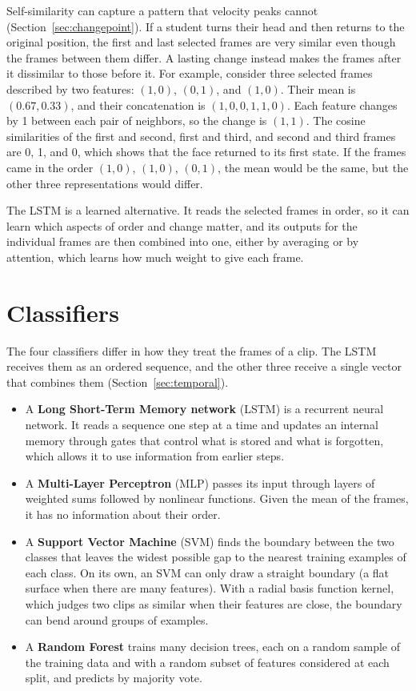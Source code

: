 Self-similarity can capture a pattern that velocity peaks cannot (Section~\ref{sec:changepoint}). If a student turns their head and then returns to the original position, the first and last selected frames are very similar even though the frames between them differ. A lasting change instead makes the frames after it dissimilar to those before it. For example, consider three selected frames described by two features: $(1, 0)$, $(0, 1)$, and $(1, 0)$. Their mean is $(0.67, 0.33)$, and their concatenation is $(1, 0, 0, 1, 1, 0)$. Each feature changes by 1 between each pair of neighbors, so the change is $(1, 1)$. The cosine similarities of the first and second, first and third, and second and third frames are 0, 1, and 0, which shows that the face returned to its first state. If the frames came in the order $(1, 0)$, $(1, 0)$, $(0, 1)$, the mean would be the same, but the other three representations would differ.

The LSTM is a learned alternative. It reads the selected frames in order, so it can learn which aspects of order and change matter, and its outputs for the individual frames are then combined into one, either by averaging or by attention, which learns how much weight to give each frame.



\section{Classifiers}
\label{sec:classifiers}

The four classifiers differ in how they treat the frames of a clip. The LSTM receives them as an ordered sequence, and the other three receive a single vector that combines them (Section~\ref{sec:temporal}).

\begin{itemize}
   \item A \textbf{Long Short-Term Memory network} (LSTM) \cite{hochreiter1997} is a recurrent neural network. It reads a sequence one step at a time and updates an internal memory through gates that control what is stored and what is forgotten, which allows it to use information from earlier steps.
   \item A \textbf{Multi-Layer Perceptron} (MLP) passes its input through layers of weighted sums followed by nonlinear functions. Given the mean of the frames, it has no information about their order.
   \item A \textbf{Support Vector Machine} (SVM) \cite{cortes1995} finds the boundary between the two classes that leaves the widest possible gap to the nearest training examples of each class. On its own, an SVM can only draw a straight boundary (a flat surface when there are many features). With a radial basis function kernel, which judges two clips as similar when their features are close, the boundary can bend around groups of examples.
   \item A \textbf{Random Forest} \cite{breiman2001} trains many decision trees, each on a random sample of the training data and with a random subset of features considered at each split, and predicts by majority vote.
\end{itemize}

